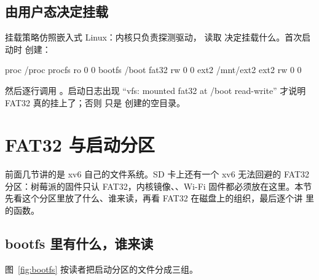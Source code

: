 \subsection{由用户态决定挂载}

挂载策略仿照嵌入式 Linux：内核只负责探测驱动， 读取  决定挂载什么。首次启动时  创建：

\begin{txtcode}
proc    /proc      procfs ro 0 0
bootfs  /boot      fat32  rw 0 0
ext2    /mnt/ext2  ext2   rw 0 0
\end{txtcode}

然后逐行调用 。启动日志出现 “vfs: mounted fat32 at /boot read-write” 才说明 FAT32 真的挂上了；否则  只是  创建的空目录。

\section{FAT32 与启动分区}
\label{sec:fat32}

前面几节讲的是 xv6 自己的文件系统。SD 卡上还有一个 xv6 无法回避的 FAT32 分区：树莓派的固件只认 FAT32，内核镜像、、Wi-Fi 固件都必须放在这里。本节先看这个分区里放了什么、谁来读，再看 FAT32 在磁盘上的组织，最后逐个讲  里的函数。

\subsection{bootfs 里有什么，谁来读}

图~\ref{fig:bootfs} 按读者把启动分区的文件分成三组。

